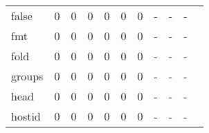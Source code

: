 \begin{longtable}{lp{1.2cm}p{1.2cm}p{1.2cm}p{1.2cm}p{1.2cm}p{1.2cm}p{1.2cm}p{1.2cm}p{1.2cm}p{1.2cm}}
false     &                                     0 &                                                  0 &                                                  0 &                                                  0 &                                                  0 &                                                  0 &                                                  - &                                                  - &                                                  - \\
fmt       &                                     0 &                                                  0 &                                                  0 &                                                  0 &                                                  0 &                                                  0 &                                                  - &                                                  - &                                                  - \\
fold      &                                     0 &                                                  0 &                                                  0 &                                                  0 &                                                  0 &                                                  0 &                                                  - &                                                  - &                                                  - \\
groups    &                                     0 &                                                  0 &                                                  0 &                                                  0 &                                                  0 &                                                  0 &                                                  - &                                                  - &                                                  - \\
head      &                                     0 &                                                  0 &                                                  0 &                                                  0 &                                                  0 &                                                  0 &                                                  - &                                                  - &                                                  - \\
hostid    &                                     0 &                                                  0 &                                                  0 &                                                  0 &                                                  0 &                                                  0 &                                                  - &                                                  - &                                                  - \\

\end{longtable}
